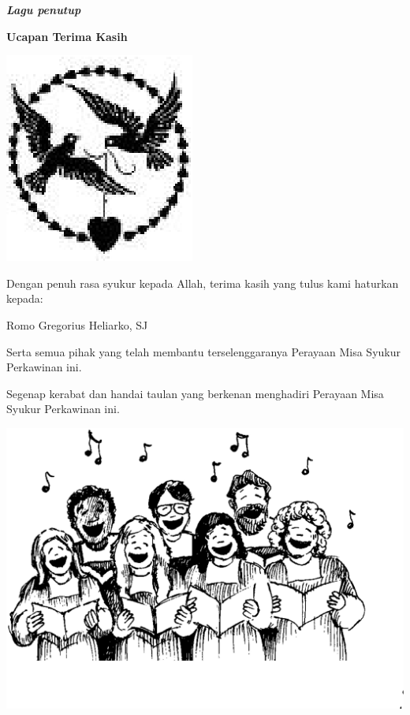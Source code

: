 \documentclass[a5paper,headsepline,titlepage,10pt]{scrbook}
\makeatletter
\newcommand{\judul}[1]{%
  {\parindent \z@ \centering \normalfont
    \interlinepenalty\@M \Large \bfseries #1\par\nobreak \vskip 20\p@ }}
\newcommand{\lagu}[1]{%
  {\parindent \z@ \normalfont
    \interlinepenalty\@M \bfseries \emph{#1}\par\nobreak \vskip 20\p@ }}
\newcommand{\romo}{Gregorius Heliarko, SJ }
\makeatother
\begin{document}
\lagu{Lagu penutup}
\newpage
\thispagestyle{empty}
\judul{Ucapan Terima Kasih}
\begin{center}
\includegraphics[scale=1]{images}

Dengan penuh rasa syukur kepada Allah, terima kasih yang tulus kami haturkan kepada:

Romo \romo \vspace{0.5cm}


Serta semua pihak yang telah membantu terselenggaranya Perayaan Misa Syukur Perkawinan ini.\vspace{0.5cm}

Segenap kerabat dan handai taulan yang berkenan menghadiri Perayaan Misa Syukur Perkawinan ini. \vspace{0.5cm}

\includegraphics[scale=0.2]{choir01}
\end{center}
\end{document}
